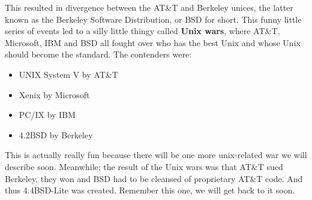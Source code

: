 \documentclass[../ops.tex]{subfiles}
\begin{document}
        This resulted in divergence between the AT\&T and Berkeley unices, the
        latter known as the Berkeley Software Distribution, or BSD for short.
        This funny little series of events led to a silly little thingy called
        {\bf Unix wars}, where AT\&T, Microsoft, IBM and BSD all fought over who
        has the best Unix and whose Unix should become the standard. The
        contenders were:
        \begin{itemize}
                \item UNIX System V by AT\&T
                \item Xenix by Microsoft
                \item PC/IX by IBM
                \item 4.2BSD by Berkeley
        \end{itemize}

        This is actually really fun because there will be one more unix-related
        war we will describe soon.
        Meanwhile: the result of the Unix wars was that AT\&T sued Berkeley,
        they won and BSD had to be cleansed of proprietary AT\&T code. And thus
        4.4BSD-Lite was created. Remember this one, we will get back to it soon.
\end{document}
